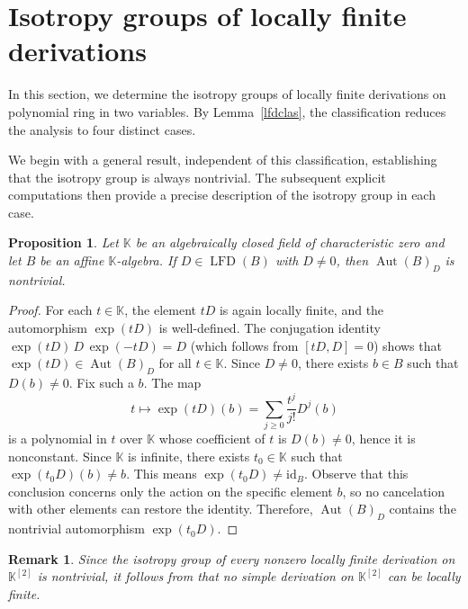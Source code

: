 \documentclass[11pt,a4paper,reqno]{amsart}
\newtheorem{proposition}[theorem]{Proposition}
\newtheorem{remark}[theorem]{Remark}}
\begin{document}
\section{Isotropy groups of locally finite derivations}\label{sec:isotropyLFD}

In this section, we determine the isotropy groups of locally finite derivations on polynomial ring in two variables. By Lemma~\ref{lfdclas}, the classification  reduces the analysis to four distinct cases.

We begin with a general result, independent of this classification, establishing that the isotropy group is always nontrivial. The subsequent explicit computations then provide a precise description of the isotropy group in each case.

\begin{proposition}\label{cor:nontrivial}
Let $\mathbb{K}$ be an algebraically closed field of characteristic zero and let $B$ be an affine $\mathbb{K}$-algebra. If $D\in \operatorname{LFD}(B)$ with $D\neq 0$, then $\operatorname{Aut}(B)_D$ is nontrivial.
\end{proposition}

\begin{proof}
For each $t\in\mathbb{K}$, the element $tD$ is again locally finite, and the automorphism $\exp(tD)$ is well-defined. The conjugation identity $\exp(tD)\,D\,\exp(-tD)=D$ (which follows from $[tD,D]=0$) shows that $\exp(tD)\in \operatorname{Aut}(B)_D$ for all $t\in\mathbb{K}$. Since $D\neq 0$, there exists $b\in B$ such that $D(b)\neq 0$. Fix such a $b$. The map
\[
t\mapsto \exp(tD)(b)=\sum_{j\ge 0}\frac{t^j}{j!}D^j(b)
\]
is a polynomial in $t$ over $\mathbb{K}$ whose coefficient of $t$ is $D(b)\neq 0$, hence it is nonconstant. Since $\mathbb{K}$ is infinite, there exists $t_0\in\mathbb{K}$ such that $\exp(t_0D)(b)\neq b$. This means $\exp(t_0D)\neq\mathrm{id}_B$. Observe that this conclusion concerns only the action on the specific element $b$, so no cancelation with other elements can restore the identity. Therefore, $\operatorname{Aut}(B)_D$ contains the nontrivial automorphism $\exp(t_0D)$.
\end{proof}


\begin{remark}
Since the isotropy group of every nonzero locally finite derivation on $\mathbb{K}^{[2]}$ is nontrivial, it follows from \cite{mendes17plane} that no simple derivation on $\mathbb{K}^{[2]}$ can be locally finite.
\end{remark}
\end{document}
